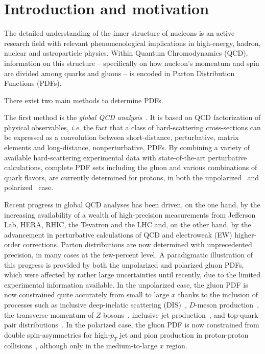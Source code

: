 \section{Introduction and motivation}

The detailed understanding of the inner structure of nucleons is an 
active research field with relevant phenomenological implications in 
high-energy, hadron, nuclear and astroparticle physics.
%
Within Quantum Chromodynamics (QCD), information on this structure --
specifically on how nucleon's momentum and spin are divided among quarks and 
gluons -- is encoded in Parton Distribution Functions (PDFs).

There exist two main methods to determine PDFs.

The first method is the {\it global QCD analysis}~\cite{Perez:2012um,
DeRoeck:2011na,Alekhin:2011sk,Ball:2012wy,Forte:2013wc,Jimenez-Delgado:2013sma,
Rojo:2015acz,Butterworth:2015oua,Accardi:2016ndt,Gao:2017yyd}.
%
It is based on QCD factorization of physical observables, {\it i.e.}
the fact that a class of hard-scattering cross-sections can be expressed as a 
convolution between short-distance, perturbative, matrix 
elements and long-distance, nonperturbative, PDFs.
%
By combining a variety of available hard-scattering experimental data with 
state-of-the-art perturbative calculations, complete PDF sets including 
the gluon and various combinations of quark flavors, are currently determined
for protons, in both the unpolarized~\cite{Ball:2017nwa,Harland-Lang:2014zoa,
Dulat:2015mca,Alekhin:2017kpj,Accardi:2016qay} and 
polarized~\cite{Nocera:2014gqa,deFlorian:2009vb,Sato:2016tuz,Hirai:2008aj} case.

Recent progress in global QCD analyses has been driven, on the one hand, 
by the increasing availability of a wealth of high-precision measurements from 
Jefferson Lab, HERA, RHIC, the Tevatron and the LHC and, on the other hand, 
by the advancement in perturbative calculations of QCD and 
electroweak (EW) higher-order corrections.
%
Parton distributions are now determined with unprecedented precision, 
in many cases at the few-percent level.
%
A paradigmatic illustration of this progress is provided by both the 
unpolarized and polarized gluon PDFs, which were affected by rather large 
uncertainties until recently, due to the limited experimental information 
available.
%
In the unpolarized case, the gluon PDF is now constrained quite accurately from 
small to large $x$ thanks to the inclusion of processes such as 
inclusive deep-inelatic scattering (DIS)~\cite{Abramowicz:2015mha}, 
$D$-meson production~\cite{Zenaiev:2015rfa,Gauld:2016kpd},
the transverse momentum of $Z$ bosons~\cite{Boughezal:2017nla},
inclusive jet production~\cite{Currie:2016bfm}, and top-quark pair
distributions~\cite{Czakon:2016olj,Guzzi:2014wia}.
%
In the polarized case, the gluon PDF is now constrained from double 
spin-asymmetries for high-$p_T$ jet and pion production in proton-proton 
collisions~\cite{deFlorian:2014yva,Nocera:2014gqa}, 
although only in the medium-to-large $x$ region.

